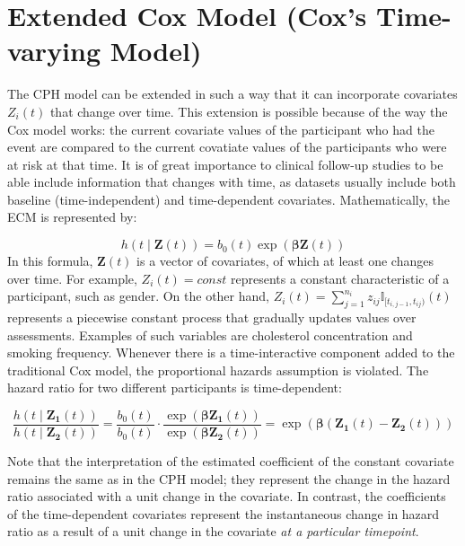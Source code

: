 \section{Extended Cox Model (Cox's Time-varying Model)}
\label{section:data:ecm}
The CPH model can be extended in such a way that it can incorporate covariates $Z_i(t)$ that change over time. This extension is possible because of the way the Cox model works: the current covariate values of the participant who had the event are compared to the current covatiate values of the participants who were at risk at that time. It is of great importance to clinical follow-up studies to be able include information that changes with time, as datasets usually include both baseline (time-independent) and time-dependent covariates. Mathematically, the ECM is represented by:  

$$
h(t \mid \mathbf{Z}(t)) =  b_0(t) \exp(\mathbf{\beta}\mathbf{Z}(t)) 
$$
In this formula, $\mathbf{Z}(t)$ is a vector of covariates, of which at least one changes over time. For example, $Z_{i}(t) = \textit{const}$ represents a constant characteristic of a participant, such as gender. On the other hand, $Z_i(t) = \sum_{j=1}^{n_i} z_{ij} \mathbb{I}_{[t_{i,j-1}, t_{ij})}(t)$ represents a piecewise constant process that gradually updates values over assessments. Examples of such variables are cholesterol concentration and smoking frequency. Whenever there is a time-interactive component added to the traditional Cox model, the proportional hazards assumption is violated. The hazard ratio for two different participants is time-dependent: 

$$\frac{h(t \mid \mathbf{Z_1}(t))}{h(t \mid \mathbf{Z_2}(t))} = \frac{b_0(t)}{b_0(t)} \cdot \frac{\exp(\mathbf{\beta}\mathbf{Z_1}(t))}{\exp(\mathbf{\beta}\mathbf{Z_2}(t))} = \exp(\mathbf{\beta} (\mathbf{Z_1}(t) - \mathbf{Z_2}(t) )) $$ 

Note that the interpretation of the estimated coefficient of the constant covariate remains the same as in the CPH model; they represent the change in the hazard ratio associated with a unit change in the covariate. In contrast, the coefficients of the time-dependent covariates represent the instantaneous change in hazard ratio as a result of a unit change in the covariate \textit{at a particular timepoint}. %

